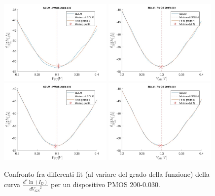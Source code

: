 \documentclass[12pt, letterpaper]{book}
\begin{document}
\begin{figure}[h!]
  \centering
  \includegraphics[width=0.49\textwidth]{SDLM-P1-200-30-grado2}
  \includegraphics[width=0.49\textwidth]{SDLM-P1-200-30-grado4}
  \includegraphics[width=0.49\textwidth]{SDLM-P1-200-30-grado6}
  \includegraphics[width=0.49\textwidth]{SDLM-P1-200-30-grado8}
  \caption{Confronto fra differenti fit (al variare del grado della funzione) della curva $\frac{d^2 \ln(I_D)}{d {V_{GS}}^2}$ per un dispositivo PMOS 200-0.030.}
  \label{fig:GradiSDLM}
\end{figure}
\end{document}
